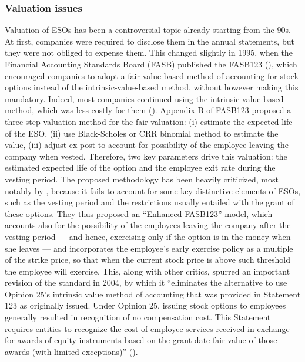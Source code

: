 \subsubsection{Valuation issues}
    Valuation of ESOs has been a controversial topic already starting from the 90s. At first, companies were required to disclose them in the annual statements, but they were not obliged to expense them. This changed slightly in 1995, when the Financial Accounting Standards Board (FASB) published the FASB123 (\cite{fasb123}), which encouraged companies to adopt a fair-value-based method of accounting for stock options instead of the intrinsic-value-based method, without however making this mandatory. Indeed, most companies continued using the intrinsic-value-based method, which was less costly for them (\cite{hull2004value}). 
    Appendix B of FASB123 proposed a three-step valuation method for the fair valuation: (i) estimate the expected life of the ESO, (ii) use Black-Scholes or CRR binomial method to estimate the value, (iii) adjust ex-post to account for possibility of the employee leaving the company when vested. Therefore, two key parameters drive this valuation: the estimated expected life of the option and the employee exit rate during the vesting period. The proposed methodology has been heavily criticized, most notably by \cite{hull2004value}, because it fails to account for some key distinctive elements of ESOs, such as the vesting period and the restrictions usually entailed with the grant of these options. They thus proposed an ``Enhanced FASB123'' model, which accounts also for the possibility of the employees leaving the company after the vesting period --- and hence, exercising only if the option is in-the-money when she leaves --- and incorporates the employee's early exercise policy as a multiple of the strike price, so that when the current stock price is above such threshold the employee will exercise. 
    This, along with other critics, spurred an important revision of the standard in 2004, by which it ``eliminates the alternative to use Opinion 25’s intrinsic value method of accounting that was provided in Statement 123 as originally issued. Under Opinion 25, issuing stock options to employees generally resulted in recognition of no compensation cost. This Statement requires entities to recognize the cost of employee services received in exchange for awards of equity instruments based on the grant-date fair value of those awards (with limited exceptions)'' (\cite{fasb123_revised}).
